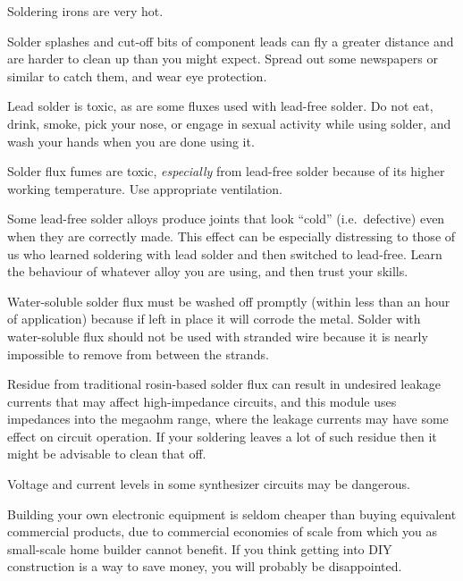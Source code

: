 Soldering irons are very hot.

Solder splashes and cut-off bits of component leads can fly a greater
distance and are harder to clean up than you might expect.  Spread out some
newspapers or similar to catch them, and wear eye protection.

Lead solder is toxic, as are some fluxes used with lead-free solder.  Do not
eat, drink, smoke, pick your nose, or engage in sexual activity while using
solder, and wash your hands when you are done using it.

Solder flux fumes are toxic, \emph{especially} from lead-free solder
because of its higher working temperature.  Use appropriate ventilation.

Some lead-free solder alloys produce joints that look ``cold''
(i.e.\ defective) even when they are correctly made.  This effect can be
especially distressing to those of us who learned soldering with lead solder
and then switched to lead-free.  Learn the behaviour of whatever alloy you  
are using, and then trust your skills.

Water-soluble solder flux must be washed off promptly (within less than an
hour of application) because if left in place it will corrode the metal. 
Solder with water-soluble flux should not be used with stranded wire because
it is nearly impossible to remove from between the strands.

Residue from traditional rosin-based solder flux can result in undesired
leakage currents that may affect high-impedance circuits, and this module
uses impedances into the megaohm range, where the leakage currents may have
some effect on circuit operation.  If your soldering leaves a lot of such
residue then it might be advisable to clean that off.

Voltage and current levels in some synthesizer circuits may be dangerous.

Building your own electronic equipment is seldom cheaper than buying
equivalent commercial products, due to commercial economies of scale from
which you as small-scale home builder cannot benefit.  If you think getting
into DIY construction is a way to save money, you will probably be
disappointed.
